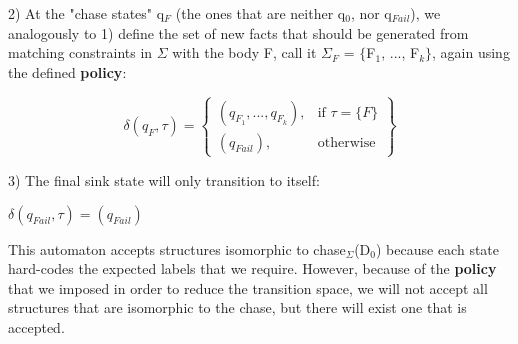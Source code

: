 \documentclass[11pt, a4paper, dvipsnames]{article}
\begin{document}
2) At the "chase states" q$_{F}$ (the ones that are neither q$_{0}$, nor q$_{Fail}$), we analogously to 1) define the set of new facts that should be generated from matching constraints in $\Sigma$ with the body F, call it $\Sigma_{F}$ = $\{$F$_{1}$, ..., F$_{k}\}$, again using the defined \textbf{policy}:
\begin{center}
\[\delta(q_{F},\tau) = \left\{\begin{array}{lr}
        (q_{F_{1}}, ..., q_{F_{k}}), & \text{if } \tau = \{F\}\\
        (q_{Fail}), & \text{otherwise} 
        \end{array}\right\}
  \] 
\end{center}
3) The final sink state will only transition to itself:
\begin{center}
$\delta(q_{Fail},\tau) = (q_{Fail})$ 
\end{center}
This automaton accepts structures isomorphic to chase$_{\Sigma}$(D$_{0}$) because each state hard-codes the expected labels that we require. However, because of the \textbf{policy} that we imposed in order to reduce the transition space, we will not accept all structures that are isomorphic to the chase, but there will exist one that is accepted.
\end{document}
